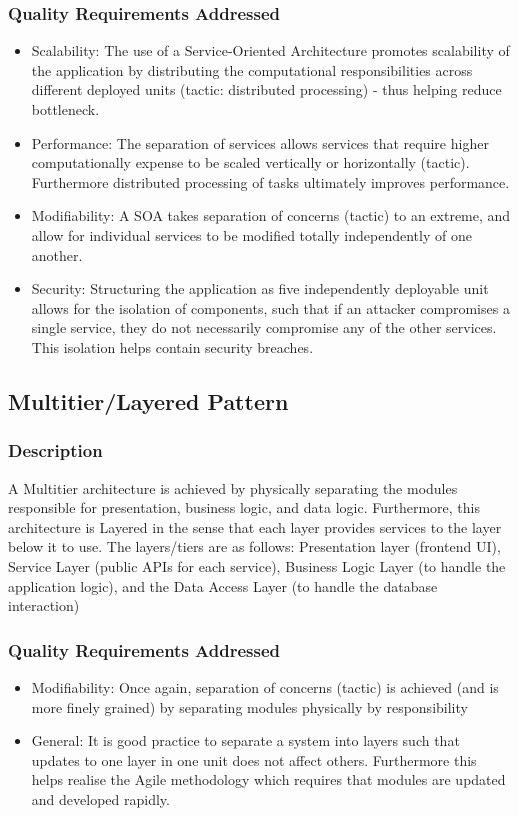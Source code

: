 \documentclass[12pt]{article}
\begin{document}
\subsubsection{Quality Requirements Addressed}
\begin{itemize}
    \item Scalability: The use of a Service-Oriented Architecture promotes scalability of the application by distributing the computational responsibilities across different deployed units (tactic: distributed processing) - thus helping reduce bottleneck.
    \item Performance: The separation of services allows services that require higher computationally expense to be scaled vertically or horizontally (tactic). Furthermore distributed processing of tasks ultimately improves performance.
    \item Modifiability: A SOA takes separation of concerns (tactic) to an extreme, and allow for individual services to be modified totally independently of one another.
    \item Security: Structuring the application as five independently deployable unit allows for the isolation of components, such that if an attacker compromises a single service, they do not necessarily compromise any of the other services. This isolation helps contain security breaches.
\end{itemize}
\subsection{Multitier/Layered Pattern}
\subsubsection{Description}
A Multitier architecture is achieved by physically separating the modules responsible for presentation, business logic, and data logic. Furthermore, this architecture is Layered in the sense that each layer provides services to the layer below it to use. The layers/tiers are as follows: Presentation layer (frontend UI), Service Layer (public APIs for each service), Business Logic Layer (to handle the application logic), and the Data Access Layer (to handle the database interaction)
\subsubsection{Quality Requirements Addressed}
\begin{itemize}
    \item Modifiability: Once again, separation of concerns (tactic) is achieved (and is more finely grained) by separating modules physically by responsibility
    \item General: It is good practice to separate a system into layers such that updates to one layer in one unit does not affect others. Furthermore this helps realise the Agile methodology which requires that modules are updated and developed rapidly.
\end{itemize}
\end{document}
